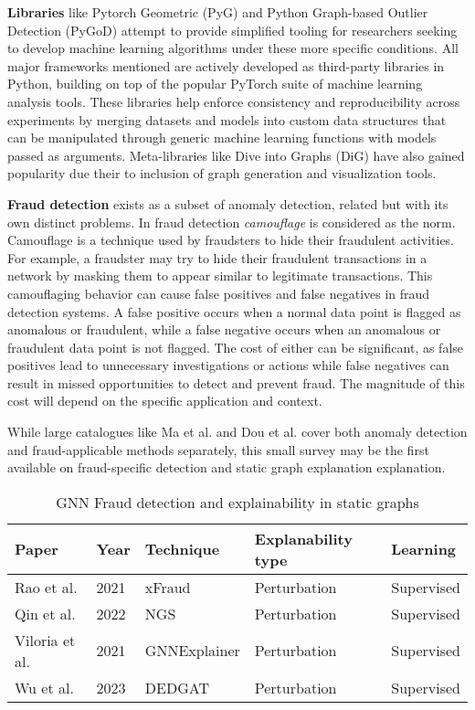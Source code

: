 \textbf{Libraries} like Pytorch Geometric (PyG)\cite{pyg_team_pyg_nodate} and Python Graph-based Outlier Detection (PyGoD)\cite{liu_pygod-teampygod_2023} attempt to provide simplified tooling for researchers seeking to develop machine learning algorithms under these more specific conditions. All major frameworks mentioned are actively developed as third-party libraries in Python, building on top of the popular PyTorch\cite{chintala_pytorchpytorch_nodate} suite of machine learning analysis tools. These libraries help enforce consistency and reproducibility across experiments by merging datasets and models into custom data structures that can be manipulated through generic machine learning functions with models passed as arguments. Meta-libraries like Dive into Graphs (DiG)\cite{dive_lab_dig_nodate} have also gained popularity due their to inclusion of graph generation and visualization tools.

\textbf{Fraud detection} exists as a subset of anomaly detection, related but with its own distinct problems. In fraud detection \textit{camouflage} is considered as the norm\cite{liu_contrast_2019}. Camouflage is a technique used by fraudsters to hide their fraudulent activities. For example, a fraudster may try to hide their fraudulent transactions in a network by masking them to appear similar to legitimate transactions. This camouflaging behavior can cause false positives and false negatives in fraud detection systems. A false positive occurs when a normal data point is flagged as anomalous or fraudulent, while a false negative occurs when an anomalous or fraudulent data point is not flagged. The cost of either can be significant, as false positives lead to unnecessary investigations or actions while false negatives can result in missed opportunities to detect and prevent fraud. The magnitude of this cost will depend on the specific application and context.

While large catalogues like Ma et al.\cite{ma_comprehensive_2021} and Dou et al.\cite{dou_safe-graphdgfraud_2023} cover both anomaly detection and fraud-applicable methods separately, this small survey may be the first available on fraud-specific detection and static graph explanation explanation.

\begin{table}
    \caption{GNN Fraud detection and explainability in static graphs}
    \label{table-1}
    \centering
    \begin{tabular}{|l|l|l|l|l|}
        \hline Paper &  Year & Technique & Explanability type & Learning \\ \hline
        Rao et al.\cite{rao_xfraud_2021} & 2021 & xFraud & Perturbation & Supervised\\
        Qin et al.\cite{qin_explainable_2022} & 2022 & NGS & Perturbation & Supervised\\
        Viloria et al.\cite{acevedo-viloria_relational_2021} & 2021 & GNNExplainer & Perturbation& Supervised\\
         Wu et al.\cite{wu_dedgat_2023}& 2023 & DEDGAT & Perturbation& Supervised\\
        \hline
    \end{tabular}
\end{table}


